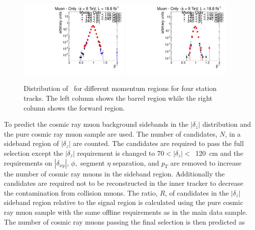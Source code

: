 \begin{figure}
\begin{center}
\includegraphics[clip=false, trim=0.0cm 0cm 0.0cm 0cm, width=0.48\textwidth]{figures/muonly/Control_Data8TeV_Pt_TOFSpectrum_Binned_2}
\includegraphics[clip=false, trim=0.0cm 0cm 0.0cm 0cm, width=0.48\textwidth]{figures/muonly/Control_Data8TeV_Pt_TOFSpectrum_Binned_5}
\caption[Distribution of \invbeta\
  for different momentum regions for four station tracks in the \muononly\ analysis.]
{Distribution of \invbeta\
for different momentum regions for four station tracks.
The  left column shows the barrel region while the right column
shows the forward region.}
\label{fig:MuOnlyControl4}
\end{center}
\end{figure}

To predict the cosmic ray muon background sidebands in the $|\delta_z|$ distribution and the pure cosmic ray muon sample are used. The number of candidates, $N$, 
in a sideband region of $|\delta_z|$ are counted. The candidates are required to pass the full selection except the $|\delta_z|$ requirement 
is changed to $70 < |\delta_z| <$~120~cm and
the requirements on $|\delta_{xy}|$, $\phi,$ segment $\eta$ separation, and $p_T$ are removed to increase the number of cosmic ray muons in the sideband region. 
Additionally the candidates
are required not to be reconstructed in the inner tracker to decrease the contamination from collision muons. The ratio, $R$, of candidates in the $|\delta_z|$ sideband region 
relative to the signal region is calculated using the pure cosmic ray muon sample with the same offline requirements as in the main data sample. The number of cosmic ray muons
passing the final selection is then predicted as 

